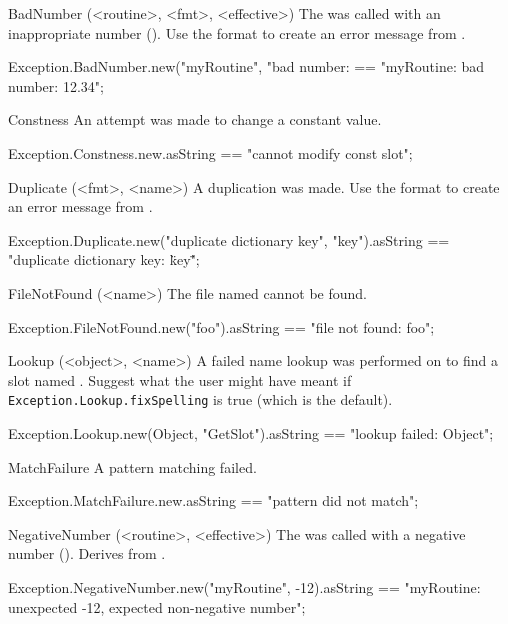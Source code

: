 \begin{urbiscriptapi}
\item[BadNumber](<routine>, <fmt>, <effective>)%
  The  was called with an inappropriate number
  ().  Use the format  to create an error
  message from .
\begin{urbiassert}
Exception.BadNumber.new("myRoutine", "bad number: %
  == "myRoutine: bad number: 12.34";
\end{urbiassert}


\item[Constness]%
  An attempt was made to change a constant value.
\begin{urbiassert}
Exception.Constness.new.asString
  == "cannot modify const slot";
\end{urbiassert}


\item[Duplicate](<fmt>, <name>)%
  A duplication was made. Use the format  to
  create an error message from .
\begin{urbiassert}
Exception.Duplicate.new("duplicate dictionary key", "key").asString
  == "duplicate dictionary key: \"key\"";
\end{urbiassert}


\item[FileNotFound](<name>)%
  The file named  cannot be found.
\begin{urbiassert}
Exception.FileNotFound.new("foo").asString
  == "file not found: foo";
\end{urbiassert}


\item[Lookup](<object>, <name>)%
  A failed name lookup was performed on  to find a slot named
  .  Suggest what the user might have meant if
  \lstinline|Exception.Lookup.fixSpelling| is true (which is the default).
\begin{urbiassert}
Exception.Lookup.new(Object, "GetSlot").asString
  == "lookup failed: Object";
\end{urbiassert}


\item[MatchFailure]%
  A pattern matching failed.
\begin{urbiassert}
Exception.MatchFailure.new.asString
  == "pattern did not match";
\end{urbiassert}


\item[NegativeNumber](<routine>, <effective>)%
  The  was called with a negative number
  ().  Derives from .
\begin{urbiassert}
Exception.NegativeNumber.new("myRoutine", -12).asString
== "myRoutine: unexpected -12, expected non-negative number";
\end{urbiassert}



\end{urbiscriptapi}
